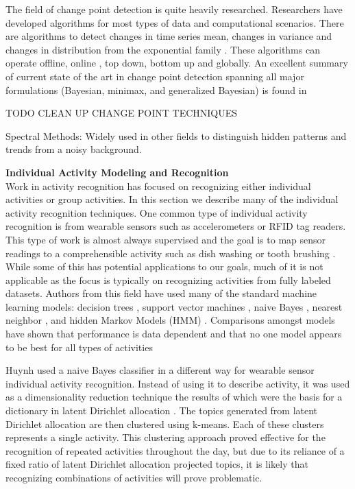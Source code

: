 The field of change point detection is quite heavily researched.  Researchers have developed algorithms for most types of data and computational scenarios.  There are algorithms to detect changes in time series mean, changes in variance and changes in distribution from the exponential family \cite{Dessein2013}.  These algorithms can operate offline, online \cite{Tartakovsky2013}, top down, bottom up and globally.  An excellent summary of current state of the art in change point detection spanning all major formulations (Bayesian, minimax, and generalized Bayesian) is found in \cite{Polunchenko2012}

TODO CLEAN UP CHANGE POINT TECHNIQUES

Spectral Methods:
Widely used in other fields to distinguish hidden patterns and trends from a noisy background.
\cite{Barford2002}

\bigskip
\noindent \textbf{Individual Activity Modeling and Recognition} \\
Work in activity recognition has focused on recognizing either individual activities or group activities.  In this section we describe many of the individual activity recognition techniques.  One common type of individual activity recognition is from wearable sensors such as accelerometers or RFID tag readers.  This type of work is almost always supervised and the goal is to map sensor readings to a comprehensible activity such as dish washing or tooth brushing \cite{Wang2009,Bao2004}.  While some of this has potential applications to our goals, much of it is not applicable as the focus is typically on recognizing activities from fully labeled datasets.  Authors from this field have used many of the standard machine learning models: decision trees \cite{Bao2004}, support vector machines \cite{Krishnan2008,Bao2004,Lustrek2009}, naive Bayes \cite{Bao2004,Lustrek2009}, nearest neighbor \cite{Bao2004,Lustrek2009}, and hidden Markov Models (HMM) \cite{Wang2009,Oliver2002}.  Comparisons amongst models have shown that performance is data dependent and that no one model appears to be best for all types of activities \cite{Bao2004,Lustrek2009}

Huynh \cite{Huynh2008} used a naive Bayes classifier in a different way for wearable sensor individual activity recognition.  Instead of using it to describe activity, it was used as a dimensionality reduction technique the results of which were the basis for a dictionary in latent Dirichlet allocation \cite{Blei2003}.  The topics generated from latent Dirichlet allocation are then clustered using k-means.  Each of these clusters represents a single activity.  This clustering approach proved effective for the recognition of repeated activities throughout the day, but due to its reliance of a fixed ratio of latent Dirichlet allocation projected topics, it is likely that recognizing combinations of activities will prove problematic.


